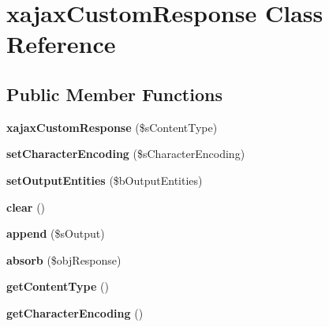 \hypertarget{classxajaxCustomResponse}{
\section{xajaxCustomResponse Class Reference}
\label{classxajaxCustomResponse}
}
\subsection*{Public Member Functions}
\begin{DoxyCompactItemize}
\item 
\hypertarget{classxajaxCustomResponse_a344c67db44164db95450ac2d961ee789}{
{\bfseries xajaxCustomResponse} (\$sContentType)}
\label{classxajaxCustomResponse_a344c67db44164db95450ac2d961ee789}

\item 
\hypertarget{classxajaxCustomResponse_af2bc89e5b901566f06b880479346c7f9}{
{\bfseries setCharacterEncoding} (\$sCharacterEncoding)}
\label{classxajaxCustomResponse_af2bc89e5b901566f06b880479346c7f9}

\item 
\hypertarget{classxajaxCustomResponse_af753d6ea7d203c05cc4b26dd430bbd16}{
{\bfseries setOutputEntities} (\$bOutputEntities)}
\label{classxajaxCustomResponse_af753d6ea7d203c05cc4b26dd430bbd16}

\item 
\hypertarget{classxajaxCustomResponse_a7774d7e152646ca808328362a672cf1f}{
{\bfseries clear} ()}
\label{classxajaxCustomResponse_a7774d7e152646ca808328362a672cf1f}

\item 
\hypertarget{classxajaxCustomResponse_acfb1930d4444cd442f1b0493ba82f291}{
{\bfseries append} (\$sOutput)}
\label{classxajaxCustomResponse_acfb1930d4444cd442f1b0493ba82f291}

\item 
\hypertarget{classxajaxCustomResponse_afbf947851e2108f8452739f1d4251724}{
{\bfseries absorb} (\$objResponse)}
\label{classxajaxCustomResponse_afbf947851e2108f8452739f1d4251724}

\item 
\hypertarget{classxajaxCustomResponse_a23e4fd2d2e80d58f6a4281c2ca3e5f05}{
{\bfseries getContentType} ()}
\label{classxajaxCustomResponse_a23e4fd2d2e80d58f6a4281c2ca3e5f05}

\item 
\hypertarget{classxajaxCustomResponse_a4dfd115d18180e8425fad8e15a557e55}{
{\bfseries getCharacterEncoding} ()}
\label{classxajaxCustomResponse_a4dfd115d18180e8425fad8e15a557e55}


\end{DoxyCompactItemize}
